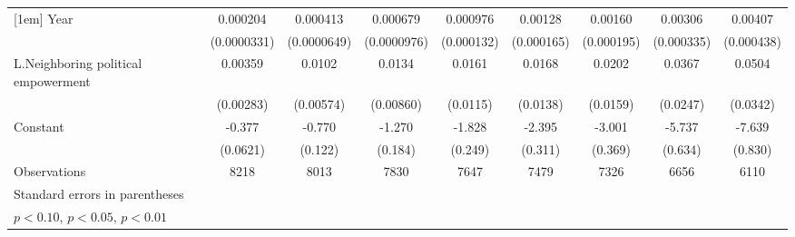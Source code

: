 \begin{table}[htbp]
\begin{tabular}{l*{8}{c}}
[1em]
Year                &    0.000204\sym{***}&    0.000413\sym{***}&    0.000679\sym{***}&    0.000976\sym{***}&     0.00128\sym{***}&     0.00160\sym{***}&     0.00306\sym{***}&     0.00407\sym{***}\\
                    & (0.0000331)         & (0.0000649)         & (0.0000976)         &  (0.000132)         &  (0.000165)         &  (0.000195)         &  (0.000335)         &  (0.000438)         \\
[1em]
L.Neighboring political empowerment&     0.00359         &      0.0102\sym{*}  &      0.0134         &      0.0161         &      0.0168         &      0.0202         &      0.0367         &      0.0504         \\
                    &   (0.00283)         &   (0.00574)         &   (0.00860)         &    (0.0115)         &    (0.0138)         &    (0.0159)         &    (0.0247)         &    (0.0342)         \\
[1em]
Constant            &      -0.377\sym{***}&      -0.770\sym{***}&      -1.270\sym{***}&      -1.828\sym{***}&      -2.395\sym{***}&      -3.001\sym{***}&      -5.737\sym{***}&      -7.639\sym{***}\\
                    &    (0.0621)         &     (0.122)         &     (0.184)         &     (0.249)         &     (0.311)         &     (0.369)         &     (0.634)         &     (0.830)         \\
\hline
Observations        &        8218         &        8013         &        7830         &        7647         &        7479         &        7326         &        6656         &        6110         \\
\hline\hline
\multicolumn{9}{l}{\footnotesize Standard errors in parentheses}\\
\multicolumn{9}{l}{\footnotesize \sym{*} \(p<0.10\), \sym{**} \(p<0.05\), \sym{***} \(p<0.01\)}\\
\end{tabular}
\end{table}
